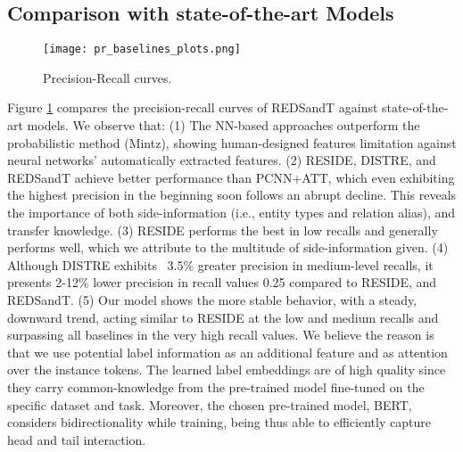 \documentclass[11pt,a4paper]{article}
\begin{document}
\subsection{Comparison with state-of-the-art Models}
\begin{figure}[H]
    \vspace{-2mm}
    \centering
    \texttt{[image: pr\_baselines\_plots.png]}
    \setlength{\abovecaptionskip}{-5pt}
    \caption{Precision-Recall curves.}
    \label{fig:pr_curves}
    \vspace{-5mm}
\end{figure}
Figure \ref{fig:pr_curves} compares the precision-recall curves of REDSandT against state-of-the-art models. We observe that:
(1) The NN-based approaches outperform the probabilistic method (Mintz), showing human-designed features limitation against neural networks' automatically extracted features. (2) RESIDE, DISTRE, and REDSandT achieve better performance than PCNN+ATT, which even exhibiting the highest precision in the beginning soon follows an abrupt decline. This reveals the importance of both side-information (i.e., entity types and relation alias), and transfer knowledge. (3) RESIDE performs the best in low recalls and generally performs well, which we attribute to the multitude of side-information given. (4) Although DISTRE exhibits ~3.5\% greater precision in medium-level recalls, it presents 2-12\% lower precision in recall values 0.25 compared to RESIDE, and REDSandT. (5) Our model shows the more stable behavior, with a steady, downward trend, acting similar to RESIDE at the low and medium recalls and surpassing all baselines in the very high recall values. We believe the reason is that we use potential label information as an additional feature and as attention over the instance tokens. The learned label embeddings are of high quality since they carry common-knowledge from the pre-trained model fine-tuned on the specific dataset and task. Moreover, the chosen pre-trained model, BERT, considers bidirectionality while training, being thus able to efficiently capture head and tail interaction.
\end{document}
